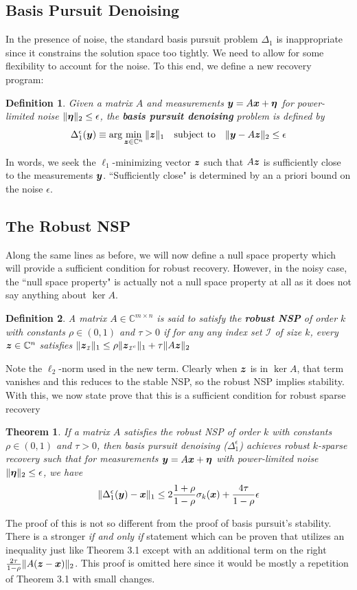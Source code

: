 \documentclass[twocolumn]{gwclass}
\newtheorem{theorem}{Theorem}[section]
\newtheorem{definition}{Definition}
\newcommand{\C}{\mathbb{C}}
\begin{document}
	\subsection{Basis Pursuit Denoising}
	In the presence of noise, the standard basis pursuit problem $\Delta_1$ is inappropriate since it constrains the solution space too tightly. We need to allow for some flexibility to account for the noise. To this end, we define a new recovery program:

	\begin{definition}
		Given a matrix $A$ and measurements $\boldsymbol{y}=A\boldsymbol{x}+\boldsymbol{\eta}$ for power-limited noise $\|\boldsymbol{\eta}\|_2\leq \epsilon$, the \textbf{basis pursuit denoising} problem is defined by
		$$ \Delta_1^\epsilon(\*y) \equiv \arg\min_{\*z\in\C^n} \|\*z\|_1 \quad\t{subject to}\quad \|\*y - A\*z\|_2\leq \epsilon $$
	\end{definition}
	In words, we seek the $\ell_1$-minimizing vector $\boldsymbol{z}$ such that $A\boldsymbol{z}$ is sufficiently close to the measurements $\boldsymbol{y}$. ``Sufficiently close" is determined by an a priori bound on the noise $\epsilon$. 
	
	\subsection{The Robust NSP}
	Along the same lines as before, we will now define a null space property which will provide a sufficient condition for robust recovery. However, in the noisy case, the ``null space property" is actually not a null space property at all as it does not say anything about $\ker A$. 
	
	\begin{definition}
		A matrix $A\in\C^{m\times n}$ is said to satisfy the \textbf{robust NSP} of order $k$ with constants $\rho\in(0,1)$ and $\tau>0$ if for any any index set $\mathcal{I}$ of size $k$, every $\*z\in\C^n$ satisfies $\|\boldsymbol{z}_{\scriptscriptstyle\mathcal{I}}\|_1 \leq \rho \|\boldsymbol{z}_{\scriptscriptstyle\mathcal{I}^c}\|_1 + \tau\|A\boldsymbol{z}\|_2$
	\end{definition}
	Note the $\ell_2$-norm used in the new term. Clearly when $\boldsymbol{z}$ is in $\ker A$, that term vanishes and this reduces to the stable NSP, so the robust NSP implies stability. With this, we now state prove that this is a sufficient condition for robust sparse recovery
	
	\begin{theorem}
		If a matrix $A$ satisfies the robust NSP of order $k$ with constants $\rho\in(0,1)$ and $\tau>0$, then basis pursuit denoising ($\Delta_1^\epsilon$) achieves robust $k$-sparse recovery such that for measurements $\boldsymbol{y}=A\boldsymbol{x}+\boldsymbol{\eta}$ with power-limited noise $\|\boldsymbol{\eta}\|_2\leq \epsilon$, we have
		$$ \|\Delta_1^\epsilon(\boldsymbol{y})-\boldsymbol{x}\|_1 \leq 2\frac{1+\rho}{1-\rho}\sigma_k(\boldsymbol{x}) + \frac{4\tau}{1-\rho}\epsilon $$
	\end{theorem}
	The proof of this is not so different from the proof of basis pursuit's stability. There is a stronger \emph{if and only if} statement which can be proven that utilizes an inequality just like Theorem 3.1 except with an additional term on the right $	\frac{2\tau}{1-\rho}\|A(\boldsymbol{z}-\boldsymbol{x})\|_2$. This proof is omitted here since it would be mostly a repetition of Theorem 3.1 with small changes.
	
\end{document}
